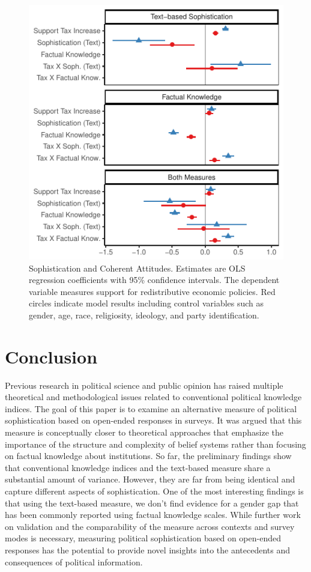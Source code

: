 \documentclass[12pt]{article}
\begin{document}
\begin{figure}\centering
\includegraphics{../fig/models2.pdf}
\caption{Sophistication and Coherent Attitudes. Estimates are OLS regression coefficients with 95\% confidence intervals. The dependent variable measures support for redistributive economic policies. Red circles indicate model results including control variables such as gender, age, race, religiosity, ideology, and party identification.}
\end{figure}


\section{Conclusion}

Previous research in political science and public opinion has raised multiple theoretical and methodological issues related to conventional political knowledge indices. The goal of this paper is to examine an alternative measure of political sophistication based on open-ended responses in surveys. It was argued that this measure is conceptually closer to theoretical approaches that emphasize the importance of the structure and complexity of belief systems rather than focusing on factual knowledge about institutions. So far, the preliminary findings show that conventional knowledge indices and the text-based measure share a substantial amount of variance. However, they are far from being identical and capture different aspects of sophistication. One of the most interesting findings is that using the text-based measure, we don't find evidence for a gender gap that has been commonly reported using factual knowledge scales. While further work on validation and the comparability of the measure across contexts and survey modes is necessary, measuring political sophistication based on open-ended responses has the potential to provide novel insights into the antecedents and consequences of political information.
\end{document}
